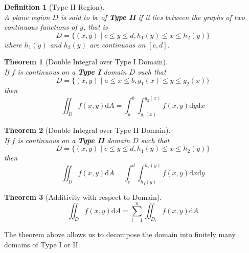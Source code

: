 \documentclass[12pt]{article}
\newtheorem{definition}{Definition}[section]
\newtheorem{theorem}{Theorem}[section]
\theoremstyle{definition}
\newcommand{\diff}{\mathrm{d}}
\begin{document}
\begin{definition}[Type II Region]
\hfill\\\normalfont A plane region $D$ is said to be of \textbf{Type II} if it lies between the graphs of two continuous functions of $y$, that is
\[
D=\{(x,y)\mid c\leq y\leq d, h_1(y)\leq x\leq h_2(y)\}
\]
where $h_1(y)$ and $h_2(y)$ are continuous on $[c,d]$.
\end{definition}
\begin{theorem}[Double Integral over Type I Domain]
\hfill\\\normalfont If $f$ is continuous on a \textbf{Type I} domain $D$ such that
\[
D=\{(x,y)\mid a\leq x\leq b, g_1(x)\leq y\leq g_2(x)\}
\]
then
\[
\iint_D f(x,y)\diff A = \int_a^b\int_{g_1(x)}^{g_2(x)} f(x,y)\diff y\diff x
\]
\end{theorem}
\begin{theorem}[Double Integral over Type II Domain]
\hfill\\\normalfont If $f$ is continuous on a \textbf{Type II} domain $D$ such that
\[
D=\{(x,y)\mid c\leq y\leq d, h_1(y)\leq x\leq h_2(y)\}
\]
then
\[
\iint_D f(x,y)\diff A = \int_c^d\int_{h_1(y)}^{h_2(y)} f(x,y)\diff x\diff y
\]
\end{theorem}
\begin{theorem}[Additivity with respect to Domain]
\hfill\\\normalfont 
\[
\iint_D f(x,y)\diff A = \sum_{i=1}^n\iint_{D_i}f(x,y)\diff A
\]
\end{theorem}
The theorem above allows us to decompose the domain into finitely many domains of Type I or II.
\clearpage
\end{document}
